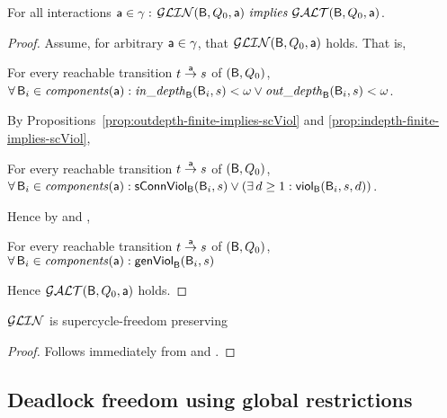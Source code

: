 \begin{lemma} \label{lemma:glob-lin-implies-globANDOR} \label{GLinGAO} \label{lem:glob-lin-implies-globANDOR} 
For all interactions $\act \in \gamma:$ $\GLin(\B, Q_0, \act)\ \impliess\ \GAO(\B, Q_0, \act)$.  
\end{lemma}
%
\begin{proof}
Assume, for arbitrary $\act \in \gamma$, that $\GLin(\B, Q_0, \act)$ holds. That is, 
 
\ind For every reachable transition $t \goesto[\act] s$ of $(\B, Q_0)$,\\
\ind \ind  $\fas \B_i \in \cmps{\act}: \widepth{\B}{\B_i}{s} < \omega \lor \wodepth{\B}{\B_i}{s} < \omega$.

\noindent
By Propositions~\ref{prop:outdepth-finite-implies-scViol} and \ref{prop:indepth-finite-implies-scViol},

\ind For every reachable transition $t \goesto[\act] s$ of $(\B, Q_0)$,\\
\ind \ind  $\fas \B_i \in \cmps{\act}:  \connViol{\B_i}{s} \lor (\ex d \ge 1: \viol{\B_i}{d}{s})$.

\noindent
Hence by  and ,

\ind For every reachable transition $t \goesto[\act] s$ of $(\B, Q_0)$,\\
\ind \ind  $\fas \B_i \in \cmps{\act} : \formViol{\B_i}{s}$

\noindent
Hence $\GAO(\B, Q_0, \act)$ holds.
\end{proof}


\begin{theorem} \label{thm:GLin.SC-free-preserving}
$\GLin$ is supercycle-freedom preserving
\end{theorem}
%
\begin{proof}
Follows immediately from  and .
\end{proof}





\subsection{Deadlock freedom using global restrictions}


